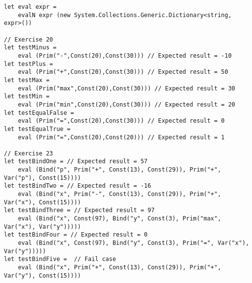 \begin{lstlisting}
let eval expr = 
    evalN expr (new System.Collections.Generic.Dictionary<string, expr>())

// Exercise 20
let testMinus = 
    eval (Prim("-",Const(20),Const(30))) // Expected result = -10
let testPlus = 
    eval (Prim("+",Const(20),Const(30))) // Expected result = 50
let testMax = 
    eval (Prim("max",Const(20),Const(30))) // Expected result = 30
let testMin = 
    eval (Prim("min",Const(20),Const(30))) // Expected result = 20
let testEqualFalse = 
    eval (Prim("=",Const(20),Const(30))) // Expected result = 0
let testEqualTrue = 
    eval (Prim("=",Const(20),Const(20))) // Expected result = 1

// Exercise 23
let testBindOne = // Expected result = 57
    eval (Bind("p", Prim("+", Const(13), Const(29)), Prim("+", Var("p"), Const(15)))) 
let testBindTwo = // Expected result = -16
    eval (Bind("x", Prim("-", Const(13), Const(29)), Prim("+", Var("x"), Const(15)))) 
let testBindThree = // Expected result = 97
    eval (Bind("x", Const(97), Bind("y", Const(3), Prim("max", Var("x"), Var("y"))))) 
let testBindFour = // Expected result = 0
    eval (Bind("x", Const(97), Bind("y", Const(3), Prim("=", Var("x"), Var("y"))))) 
let testBindFive =  // Fail case
    eval (Bind("x", Prim("+", Const(13), Const(29)), Prim("+", Var("y"), Const(15))))
\end{lstlisting}
